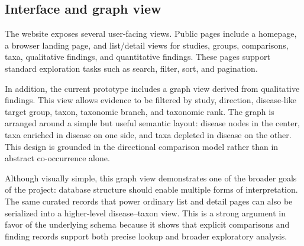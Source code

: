 \subsection{Interface and graph view}

The website exposes several user-facing views. Public pages include a homepage, a browser landing page, and list/detail views for studies, groups, comparisons, taxa, qualitative findings, and quantitative findings. These pages support standard exploration tasks such as search, filter, sort, and pagination.

In addition, the current prototype includes a graph view derived from qualitative findings. This view allows evidence to be filtered by study, direction, disease-like target group, taxon, taxonomic branch, and taxonomic rank. The graph is arranged around a simple but useful semantic layout: disease nodes in the center, taxa enriched in disease on one side, and taxa depleted in disease on the other. This design is grounded in the directional comparison model rather than in abstract co-occurrence alone.

Although visually simple, this graph view demonstrates one of the broader goals of the project: database structure should enable multiple forms of interpretation. The same curated records that power ordinary list and detail pages can also be serialized into a higher-level disease--taxon view. This is a strong argument in favor of the underlying schema because it shows that explicit comparisons and finding records support both precise lookup and broader exploratory analysis.
